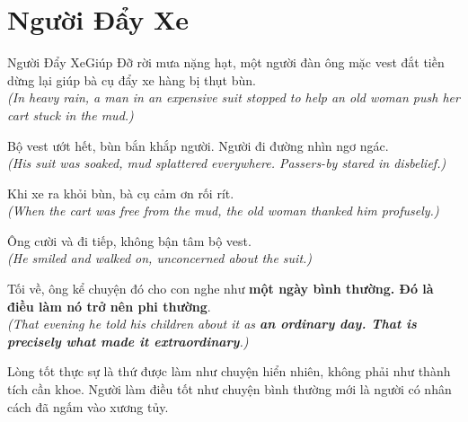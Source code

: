 \section{Người Đẩy Xe}
\begin{truyen}{Người Đẩy Xe}{Giúp Đỡ}
rời mưa nặng hạt, một người đàn ông mặc vest đắt tiền dừng lại giúp bà cụ đẩy xe hàng bị thụt bùn.\\
\textit{(In heavy rain, a man in an expensive suit stopped to help an old woman push her cart stuck in the mud.)}

Bộ vest ướt hết, bùn bắn khắp người. Người đi đường nhìn ngơ ngác.\\
\textit{(His suit was soaked, mud splattered everywhere. Passers-by stared in disbelief.)}

Khi xe ra khỏi bùn, bà cụ cảm ơn rối rít.\\
\textit{(When the cart was free from the mud, the old woman thanked him profusely.)}

Ông cười và đi tiếp, không bận tâm bộ vest.\\
\textit{(He smiled and walked on, unconcerned about the suit.)}

Tối về, ông kể chuyện đó cho con nghe như \textbf{một ngày bình thường. Đó là điều làm nó trở nên phi thường}.\\
\textit{(That evening he told his children about it as \textbf{an ordinary day. That is precisely what made it extraordinary}.)}
\end{truyen}
\begin{baihoc}
  Lòng tốt thực sự là thứ được làm như chuyện hiển nhiên, không phải như thành tích cần khoe. Người làm điều tốt như chuyện bình thường mới là người có nhân cách đã ngấm vào xương tủy.
\end{baihoc}

